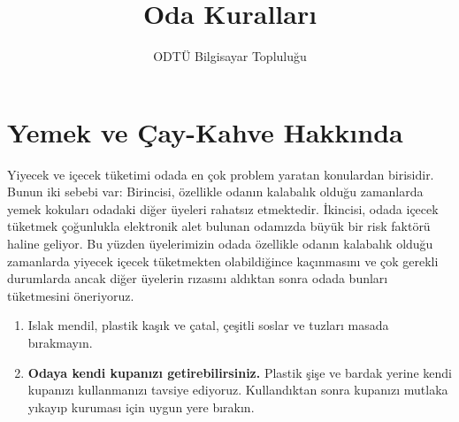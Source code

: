\documentclass{article}
\title{Oda Kuralları}
\author{ODTÜ Bilgisayar Topluluğu}
\begin{document}
\maketitle



\section{Yemek ve Çay-Kahve Hakkında}

Yiyecek ve içecek tüketimi odada en çok problem yaratan konulardan birisidir.
Bunun iki sebebi var: Birincisi, özellikle odanın kalabalık olduğu zamanlarda
yemek kokuları odadaki diğer üyeleri rahatsız etmektedir. İkincisi, odada içecek
tüketmek çoğunlukla elektronik alet bulunan odamızda büyük bir risk faktörü haline geliyor. Bu yüzden üyelerimizin odada özellikle odanın kalabalık olduğu
zamanlarda yiyecek içecek tüketmekten olabildiğince kaçınmasını ve çok gerekli
durumlarda ancak diğer üyelerin rızasını aldıktan sonra odada bunları
tüketmesini öneriyoruz.
\begin{enumerate}
    \item Islak mendil, plastik kaşık ve çatal, çeşitli soslar ve tuzları masada bırakmayın.
    \item \textbf{Odaya kendi kupanızı getirebilirsiniz.} Plastik şişe ve bardak yerine kendi kupanızı kullanmanızı tavsiye ediyoruz. Kullandıktan sonra kupanızı mutlaka yıkayıp kuruması için uygun yere bırakın.
\end{enumerate}
\end{document}
